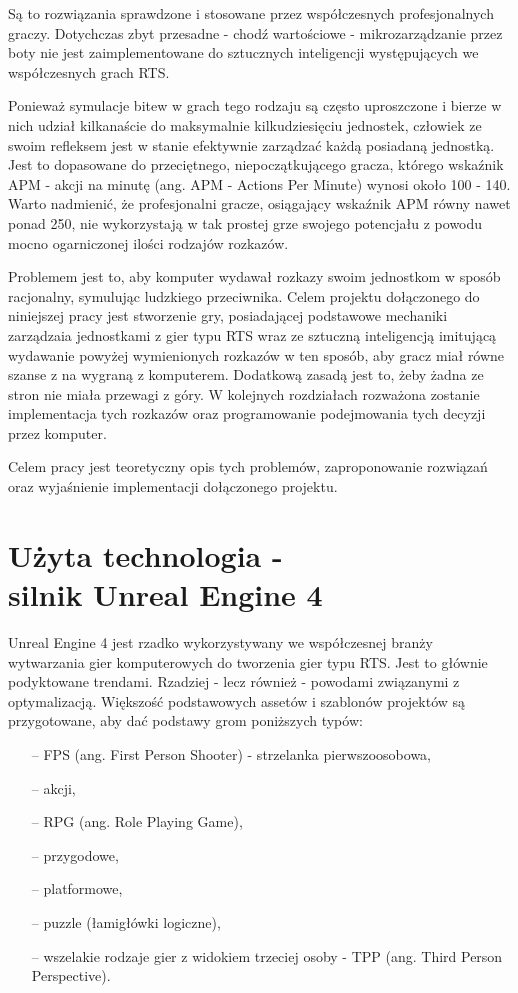 \documentclass[12pt]{report}
\begin{document}
Są to rozwiązania sprawdzone i stosowane przez współczesnych profesjonalnych graczy. Dotychczas zbyt przesadne - chodź wartościowe - mikrozarządzanie przez boty nie jest zaimplementowane do sztucznych inteligencji występujących we współczesnych grach  RTS. 

Ponieważ symulacje bitew w grach tego rodzaju są często uproszczone i bierze w nich udział kilkanaście do maksymalnie kilkudziesięciu jednostek, człowiek ze swoim refleksem jest w stanie efektywnie zarządzać każdą posiadaną jednostką. Jest to dopasowane do przeciętnego, niepoczątkującego gracza, którego wskaźnik APM - akcji na minutę (ang. APM - Actions Per Minute) wynosi około 100 - 140. Warto nadmienić, że profesjonalni gracze, osiągający wskaźnik APM równy nawet ponad 250, nie wykorzystają w tak prostej grze swojego potencjału z powodu mocno ogarniczonej ilości rodzajów rozkazów.

Problemem jest to, aby komputer wydawał rozkazy swoim jednostkom w sposób racjonalny, symulując ludzkiego przeciwnika. Celem projektu dołączonego do niniejszej pracy jest stworzenie gry, posiadającej podstawowe mechaniki zarządzaia jednostkami z gier typu RTS wraz ze sztuczną inteligencją imitującą wydawanie powyżej wymienionych rozkazów w ten sposób, aby gracz miał równe szanse z na wygraną z komputerem. Dodatkową zasadą jest to, żeby żadna ze stron nie miała przewagi z góry. W kolejnych rozdziałach rozważona zostanie implementacja tych rozkazów oraz programowanie podejmowania tych decyzji przez komputer. 

Celem pracy jest teoretyczny opis tych problemów, zaproponowanie rozwiązań oraz wyjaśnienie implementacji dołączonego projektu.

\chapter{Użyta technologia - \\silnik Unreal Engine 4}

Unreal Engine 4 jest rzadko wykorzystywany we współczesnej branży wytwarzania gier komputerowych do tworzenia gier typu RTS. Jest to głównie podyktowane trendami. Rzadziej - lecz również - powodami związanymi z optymalizacją. Większość podstawowych assetów i szablonów projektów są przygotowane, aby dać podstawy grom poniższych typów:
\begin{itemize}
\item[--] FPS (ang. First Person Shooter) - strzelanka pierwszoosobowa,
\item[--] akcji,
\item[--] RPG (ang. Role Playing Game),
\item[--] przygodowe,
\item[--] platformowe,
\item[--] puzzle (łamigłówki logiczne),
\item[--] wszelakie rodzaje gier z widokiem trzeciej osoby - TPP (ang. Third Person Perspective).
\end{itemize}
\end{document}
